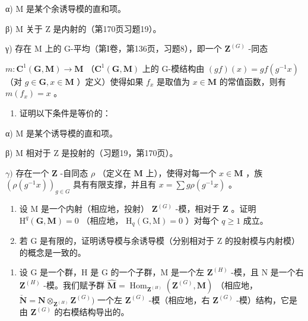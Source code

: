 α) M 是某个余诱导模的直和项。

β) M 关于 Z 是内射的（第170页习题19）。

γ) 存在 M 上的 G-平均（第I卷，第136页，习题8），即一个 \(\mathbf{Z}^{(G)}\) -同态

\(m: \mathbf{C}^{1}(\mathbf{G}, \mathbf{M}) \to \mathbf{M}\) （\(\mathbf{C}^{1}(\mathbf{G}, \mathbf{M})\) 上的 G-模结构由 \((gf)(x) = gf(g^{-1}x)\) （对 \(g \in \mathbf{G}, x \in \mathbf{M}\) ）定义）使得如果 \(f_{x}\) 是取值为 \(x \in \mathbf{M}\) 的常值函数，则有 \(m(f_{x}) = x\) 。

\begin{enumerate}
\def\labelenumi{\alph{enumi})}
\setcounter{enumi}{2}
\tightlist
\item
  证明以下条件是等价的：
\end{enumerate}

α) M 是某个诱导模的直和项。

β) M 相对于 Z 是投射的（习题19，第170页）。

\(\gamma)\) 存在一个 \(\mathbf{Z}\) -自同态 \(\rho\) （定义在 \(\mathbf{M}\) 上），使得对每一个 \(x \in \mathbf{M}\) ，族 \((\rho(g^{-1} x))_{g \in G}\) 具有有限支撑，并且有 \(x = \sum g\rho(g^{-1} x)\) 。

\begin{enumerate}
\def\labelenumi{\alph{enumi})}
\setcounter{enumi}{3}
\item
  设 M 是一个内射（相应地，投射） \(\mathbf{Z}^{(G)}\) -模，相对于 \(\mathbf{Z}\) 。证明 \(\mathrm{H}^q (\mathbf{G},\mathbf{M}) = 0\) （相应地， \(\mathrm{H}_q(\mathrm{G},\mathrm{M}) = 0\) ）对每个 \(q\geqslant 1\) 成立。
\item
  若 G 是有限的，证明诱导模与余诱导模（分别相对于 Z 的投射模与内射模）的概念是一致的。
\end{enumerate}

\begin{enumerate}
\def\labelenumi{\arabic{enumi})}
\setcounter{enumi}{12}
\tightlist
\item
  设 G 是一个群，H 是 G 的一个子群，M 是一个左 \(\mathbf{Z}^{(H)}\) -模，且 N 是一个右 \(\mathbf{Z}^{(H)}\) -模。我们赋予群 \(\hat{\mathbf{M}} = \operatorname{Hom}_{\mathbf{Z}^{(H)}} (\mathbf{Z}^{(G)}, \mathbf{M})\) （相应地， \(\check{\mathbf{N}} = \mathbf{N} \otimes_{\mathbf{Z}^{(H)}} \mathbf{Z}^{(G)})\) 一个左 \(\mathbf{Z}^{(G)}\) -模（相应地，右 \(\mathbf{Z}^{(G)}\) -模）结构，它是由 \(\mathbf{Z}^{(G)}\) 的右模结构导出的。
\end{enumerate}


